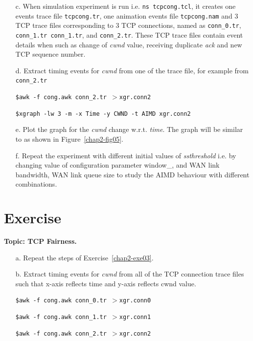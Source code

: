 \begin{multicols}{2}
\begin{itemize}
\item[c.] When simulation experiment is run i.e. \texttt{ns tcpcong.tcl}, it creates one events trace file \texttt{tcpcong.tr}, one animation events file \texttt{tcpcong.nam} and 3 TCP trace files corresponding to 3 TCP connections, named as \texttt{conn\_0.tr}, \texttt{conn\_1.tr conn\_1.tr}, and \texttt{conn\_2.tr}. These TCP trace files contain event details when such as change of \textit{cwnd} value, receiving duplicate \textit{ack} and new TCP sequence number.

\item[d.] Extract timing events for \textit{cwnd} from one of the trace file, for example from \texttt{conn\_2.tr}

\texttt{\$awk -f cong.awk conn\_2.tr $> $xgr.conn2}

\texttt{\$xgraph -lw 3 -m -x Time -y CWND -t AIMD xgr.conn2}

\item[e.] Plot the graph for the \textit{cwnd} change w.r.t. \textit{time}. The graph will be similar to as shown in Figure~\ref{chap2-fig05}.

\item[f.] Repeat the experiment with different initial values of \textit{ssthreshold} i.e. by changing value of configuration parameter window\_, and WAN link bandwidth, WAN link queue size to study the AIMD behaviour with different combinations.
\end{itemize}

\section*{Exercise \label{chap2-exe04}}

\textbf{Topic: TCP Fairness.}

\begin{itemize}

\item[a.] Repeat the steps of Exercise~\ref{chap2-exe03}.

\item[b.] Extract timing events for \textit{cwnd} from all of the TCP connection trace files such that x-axis reflects time and y-axis reflects cwnd value.

\texttt{\$awk -f cong.awk conn\_0.tr $> $xgr.conn0}

\texttt{\$awk -f cong.awk conn\_1.tr $> $xgr.conn1}

\texttt{\$awk -f cong.awk conn\_2.tr $> $xgr.conn2}


\end{itemize}
\end{multicols}
